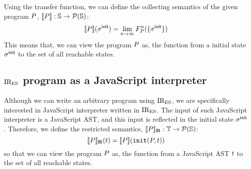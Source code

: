 Using the transfer function, we can define the collecting semantics of the given program $P$,
$\llbracket{P}\rrbracket: \mathbb{S} \rightarrow \mathcal{P}(\mathbb{S})$:
\[
  \llbracket{P}\rrbracket(\sigma^{\textsf{init}}) = \lim_{n \rightarrow \infty}F_{P}^n( \{ \sigma^{\textsf{init}} \} ) \\
\]
This means that, we can view the program $P$ as, the function from a initial state
$\sigma^{\textsf{init}}$ to the set of all reachable states.

\subsection{$\text{IR}_\text{ES}$ program as a JavaScript interpreter}
Although we can write an arbitrary program using $\text{IR}_\text{ES}$, we are specifically interested in
JavaScript interpreter written in $\text{IR}_\text{ES}$. The input of such JavaScript interpreter is a JavaScript AST,
and this input is reflected in the initial state $\sigma^{\textsf{init}}$.
Therefore, we define the restricted semantics,
$\llbracket{P}\rrbracket_\textbf{R}: \mathbb{T} \rightarrow \mathcal{P}(\mathbb{S})$:
\[
  \rsem{\prog}(\tree) = \sem{\prog}( \getinitst(\prog, \tree) ) \\
\]
so that we can view the program $P$ as, the function from a JavaScript AST
$t$ to the set of all reachable states.
